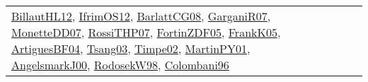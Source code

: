 {\begin{longtable}{llp{6cm}p{6cm}p{6cm}}
\href{papers/BillautHL12.pdf}{BillautHL12}\cite{BillautHL12}, \href{papers/IfrimOS12.pdf}{IfrimOS12}\cite{IfrimOS12}, \href{papers/BarlattCG08.pdf}{BarlattCG08}\cite{BarlattCG08}, \href{papers/GarganiR07.pdf}{GarganiR07}\cite{GarganiR07}, \href{papers/MonetteDD07.pdf}{MonetteDD07}\cite{MonetteDD07}, \href{papers/RossiTHP07.pdf}{RossiTHP07}\cite{RossiTHP07}, \href{papers/FortinZDF05.pdf}{FortinZDF05}\cite{FortinZDF05}, \href{papers/FrankK05.pdf}{FrankK05}\cite{FrankK05}, \href{papers/ArtiguesBF04.pdf}{ArtiguesBF04}\cite{ArtiguesBF04}, \href{articles/Tsang03.pdf}{Tsang03}\cite{Tsang03}, \href{articles/Timpe02.pdf}{Timpe02}\cite{Timpe02}, \href{articles/MartinPY01.pdf}{MartinPY01}\cite{MartinPY01}, \href{papers/AngelsmarkJ00.pdf}{AngelsmarkJ00}\cite{AngelsmarkJ00}, \href{papers/RodosekW98.pdf}{RodosekW98}\cite{RodosekW98}, \href{papers/Colombani96.pdf}{Colombani96}\cite{Colombani96}\\

\end{longtable}}
